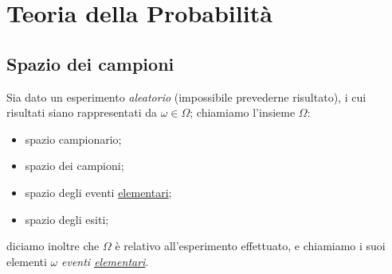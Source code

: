 
\chapter{Teoria della Probabilità}
    \section{Spazio dei campioni}
        \begin{defn}
            Sia dato un esperimento \emph{aleatorio} (impossibile prevederne risultato), i cui risultati siano rappresentati da $\omega \in \Omega$; chiamiamo l'insieme $\Omega$:
            \begin{itemize}
                \item spazio campionario;
                \item spazio dei campioni;
                \item spazio degli eventi \underline{elementari};
                \item spazio degli esiti;
            \end{itemize}
            diciamo inoltre che $\Omega$ è relativo all'esperimento effettuato, e chiamiamo i suoi elementi $\omega$ \emph{eventi \underline{elementari}}.
        \end{defn}
